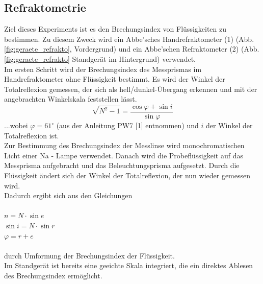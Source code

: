 \documentclass[12pt,a4paper]{article}
\begin{document}
\begin{multicols}{2}
\section{Refraktometrie}
Ziel dieses Experiments ist es den Brechungsindex von Flüssigkeiten zu bestimmen. Zu diesem Zweck wird ein Abbe’sches Handrefraktometer (1) (Abb. \ref{fig:geraete_refrakto}, Vordergrund) und  ein Abbe’schen Refraktometer (2) (Abb.  \ref{fig:geraete_refrakto} Standgerät im Hintergrund) verwendet. 
\\
Im ersten Schritt wird der Brechungsindex des Messprismas im Handrefraktometer ohne Flüssigkeit bestimmt. Es wird der Winkel der Totalreflexion gemessen, der sich als hell/dunkel-Übergang erkennen und mit der angebrachten Winkelskala feststellen lässt. 
$$\sqrt{N^2-1}=\frac{\cos{\varphi}+\sin{i}}{\sin{\varphi}}$$
...wobei $\varphi = 61^\circ$ (aus der Anleitung PW7 [1] entnommen) und $i$ der Winkel der Totalreflexion ist.
\\
Zur Bestimmung des Brechungsindex der Messlinse wird monochromatischen Licht einer Na - Lampe verwendet.
\noindent
Danach wird die Probeflüssigkeit auf das Messprisma aufgebracht und das Beleuchtungsprisma aufgesetzt. Durch die Flüssigkeit ändert sich der Winkel der Totalreflexion, der nun wieder gemessen wird. 
\\
Dadurch ergibt sich aus den Gleichungen
\\
\\
\indent $n=N\cdot \sin{e}$\\
\indent $\sin i = N \cdot \sin r$\\
\indent $\varphi = r + e$
\\
\\
durch Umformung der Brechungsindex der Flüssigkeit. 
\\
Im Standgerät ist bereits eine geeichte Skala integriert, die ein direktes Ablesen des Brechungsindex ermöglicht.


\end{multicols}
\end{document}
